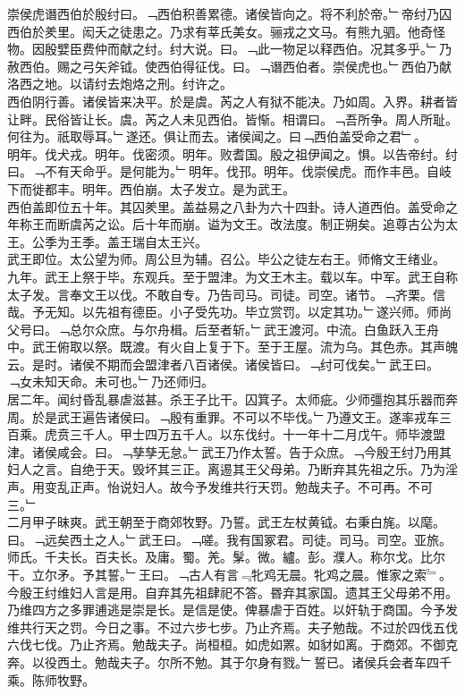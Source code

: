 \documentclass{zhvt-classic}
\begin{document}
\hspace*{2em}崇侯虎谮西伯於殷纣曰。﹁西伯积善累德。诸侯皆向之。将不利於帝。﹂帝纣乃囚西伯於羑里。闳夭之徒患之。乃求有莘氏美女。骊戎之文马。有熊九驷。他奇怪物。因殷嬖臣费仲而献之纣。纣大说。曰。﹁此一物足以释西伯。况其多乎。﹂乃赦西伯。赐之弓矢斧钺。使西伯得征伐。曰。﹁谮西伯者。崇侯虎也。﹂西伯乃献洛西之地。以请纣去炮烙之刑。纣许之。\\
\hspace*{2em}西伯阴行善。诸侯皆来决平。於是虞。芮之人有狱不能决。乃如周。入界。耕者皆让畔。民俗皆让长。虞。芮之人未见西伯。皆惭。相谓曰。﹁吾所争。周人所耻。何往为。祇取辱耳。﹂遂还。俱让而去。诸侯闻之。曰﹁西伯盖受命之君﹂。\\
\hspace*{2em}明年。伐犬戎。明年。伐密须。明年。败耆国。殷之祖伊闻之。惧。以告帝纣。纣曰。﹁不有天命乎。是何能为。﹂明年。伐邘。明年。伐崇侯虎。而作丰邑。自岐下而徙都丰。明年。西伯崩。太子发立。是为武王。\\
\hspace*{2em}西伯盖即位五十年。其囚羑里。盖益易之八卦为六十四卦。诗人道西伯。盖受命之年称王而断虞芮之讼。后十年而崩。谥为文王。改法度。制正朔矣。追尊古公为太王。公季为王季。盖王瑞自太王兴。\\
\hspace*{2em}武王即位。太公望为师。周公旦为辅。召公。毕公之徒左右王。师脩文王绪业。\\
\hspace*{2em}九年。武王上祭于毕。东观兵。至于盟津。为文王木主。载以车。中军。武王自称太子发。言奉文王以伐。不敢自专。乃告司马。司徒。司空。诸节。﹁齐栗。信哉。予无知。以先祖有德臣。小子受先功。毕立赏罚。以定其功。﹂遂兴师。师尚父号曰。﹁总尔众庶。与尔舟楫。后至者斩。﹂武王渡河。中流。白鱼跃入王舟中。武王俯取以祭。既渡。有火自上复于下。至于王屋。流为乌。其色赤。其声魄云。是时。诸侯不期而会盟津者八百诸侯。诸侯皆曰。﹁纣可伐矣。﹂武王曰。﹁女未知天命。未可也。﹂乃还师归。\\
\hspace*{2em}居二年。闻纣昏乱暴虐滋甚。杀王子比干。囚箕子。太师疵。少师彊抱其乐器而奔周。於是武王遍告诸侯曰。﹁殷有重罪。不可以不毕伐。﹂乃遵文王。遂率戎车三百乘。虎贲三千人。甲士四万五千人。以东伐纣。十一年十二月戊午。师毕渡盟津。诸侯咸会。曰。﹁孳孳无怠。﹂武王乃作太誓。告于众庶。﹁今殷王纣乃用其妇人之言。自绝于天。毁坏其三正。离逷其王父母弟。乃断弃其先祖之乐。乃为淫声。用变乱正声。怡说妇人。故今予发维共行天罚。勉哉夫子。不可再。不可三。﹂\\
\hspace*{2em}二月甲子昧爽。武王朝至于商郊牧野。乃誓。武王左杖黄钺。右秉白旄。以麾。曰。﹁远矣西土之人。﹂武王曰。﹁嗟。我有国冢君。司徒。司马。司空。亚旅。师氏。千夫长。百夫长。及庸。蜀。羌。髳。微。纑。彭。濮人。称尔戈。比尔干。立尔矛。予其誓。﹂王曰。﹁古人有言﹃牝鸡无晨。牝鸡之晨。惟家之索﹄。今殷王纣维妇人言是用。自弃其先祖肆祀不答。昬弃其家国。遗其王父母弟不用。乃维四方之多罪逋逃是崇是长。是信是使。俾暴虐于百姓。以奸轨于商国。今予发维共行天之罚。今日之事。不过六步七步。乃止齐焉。夫子勉哉。不过於四伐五伐六伐七伐。乃止齐焉。勉哉夫子。尚桓桓。如虎如罴。如豺如离。于商郊。不御克奔。以役西土。勉哉夫子。尔所不勉。其于尔身有戮。﹂誓已。诸侯兵会者车四千乘。陈师牧野。\\
\end{document}
